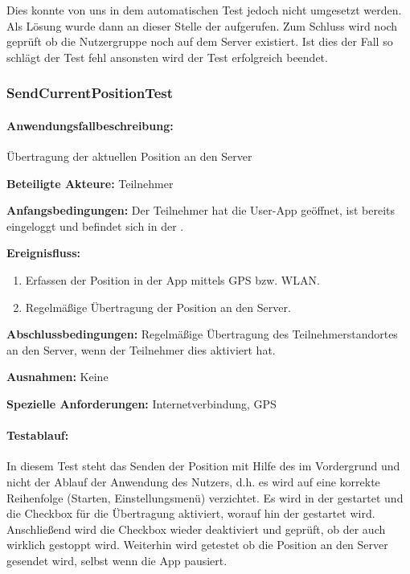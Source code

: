Dies konnte von uns in dem automatischen Test jedoch nicht umgesetzt werden. Als Lösung wurde dann an dieser Stelle der  aufgerufen. Zum Schluss wird noch geprüft ob die Nutzergruppe noch auf dem Server existiert. Ist dies der Fall so schlägt der Test fehl ansonsten wird der Test erfolgreich beendet.

\subsubsection{SendCurrentPositionTest}
\paragraph{Anwendungsfallbeschreibung:} Übertragung der aktuellen Position an den Server

\textbf{Beteiligte Akteure:}
	Teilnehmer
	
\textbf{Anfangsbedingungen:}
	Der Teilnehmer hat die User-App geöffnet, ist bereits eingeloggt und befindet sich in der .
	
\textbf{Ereignisfluss:}
	\begin{enumerate}
		\item Erfassen der Position in der App mittels GPS bzw. WLAN.
		\item Regelmäßige Übertragung der Position an den Server.
	\end{enumerate}
	
\textbf{Abschlussbedingungen:}
	Regelmäßige Übertragung des Teilnehmerstandortes an den Server, wenn der Teilnehmer dies aktiviert hat.
	
\textbf{Ausnahmen:}
	Keine
	
\textbf{Spezielle Anforderungen:}
	Internetverbindung, GPS

\paragraph{Testablauf:}
In diesem Test steht das Senden der Position mit Hilfe des  im Vordergrund und nicht der Ablauf der Anwendung des Nutzers, d.h. es wird auf eine korrekte Reihenfolge (Starten, Einstellungsmenü) verzichtet.
Es wird in der  gestartet und die Checkbox für die Übertragung aktiviert, worauf hin der  gestartet wird. Anschließend wird die Checkbox wieder deaktiviert und geprüft, ob der   auch wirklich gestoppt wird. Weiterhin wird getestet ob die Position an den Server gesendet wird, selbst wenn die App pausiert.


